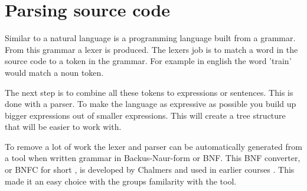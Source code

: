 \section{Parsing source code} \label{sec:bnfc}


Similar to a natural language is a programming language built from a grammar. 
From this grammar a lexer is produced. The lexers job is to match a word in the
source code to a token in the grammar. For example in english the word 'train' 
would match a noun token. 

The next step is to combine all these tokens to expressions or sentences. This
is done with a parser. To make the language as expressive as possible you build
up bigger expressions out of smaller expressions. This will create a tree
structure that will be easier to work with. 

To remove a lot of work the lexer and parser can be automatically generated from
a tool when written grammar in Backus-Naur-form or BNF. This BNF converter, or
BNFC for short , is developed by Chalmers and used in earlier courses .
This made it an easy choice with the groups familarity with the tool.


